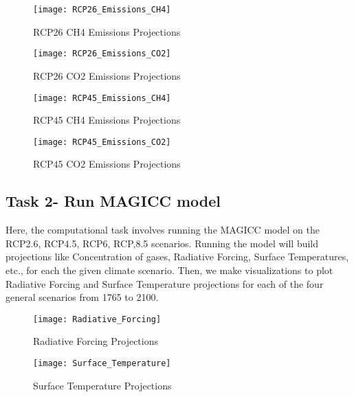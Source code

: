 \documentclass{article}
\begin{document}
\begin{figure}[ht]
    \texttt{[image: RCP26\_Emissions\_CH4]}
    \caption{RCP26 CH4 Emissions Projections}
\end{figure}

\begin{figure}
    \texttt{[image: RCP26\_Emissions\_CO2]}
    \caption{RCP26 CO2 Emissions Projections}
\end{figure}

\begin{figure}
    \texttt{[image: RCP45\_Emissions\_CH4]}
    \caption{RCP45 CH4 Emissions Projections}
\end{figure}

\begin{figure}
    \texttt{[image: RCP45\_Emissions\_CO2]}
    \caption{RCP45 CO2 Emissions Projections}
\end{figure}

\clearpage
\subsection{Task 2- Run MAGICC model}
Here, the computational task involves running the MAGICC model on the RCP2.6, RCP4.5, RCP6, RCP,8.5
scenarios. Running the model will build projections like Concentration of gases, Radiative Forcing,
Surface Temperatures, etc., for each the given climate scenario. Then, we make visualizations to plot
Radiative Forcing and Surface Temperature projections for each of the four general scenarios from 1765 to 2100.

\begin{figure}[H]
\texttt{[image: Radiative\_Forcing]}
\caption{Radiative Forcing Projections}
\end{figure}

\begin{figure}[H]
\texttt{[image: Surface\_Temperature]}
\caption{Surface Temperature Projections}
\end{figure}
    



\end{document}
